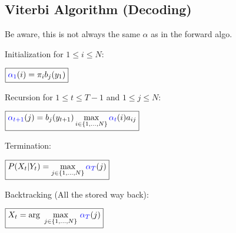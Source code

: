 \begin{minipage}[t]{0.49\textwidth}
\subsection{Viterbi Algorithm (Decoding)}
Be aware, this is not always the same $\alpha$ as in the forward algo.
\begin{aufzaehlung}
	\item Initialization for $1\leq i \leq N$:\\
	
	\vspace{-0.3cm}
	
	$\boxed{\textcolor{blue}{\alpha_1}(i)=\pi_i b_j(y_{1})}$
	\item Recursion for $1\leq t\leq T-1$ and $1\leq j \leq N$:\\
			
		\vspace{-0.3cm}
		
		$\boxed{\textcolor{blue}{\alpha_{t+1}}(j)=b_{j}(y_{t+1}) \max\limits_{i \in \{1,\ldots,N\}}{\textcolor{blue}{\alpha_t}(i)a_{ij}}}$
		
		\item Termination:\\
			
		\vspace{-0.3cm}
		
		$\boxed{P(X_t|Y_t)=\max\limits_{j \in \{1,\ldots,N\}}{\textcolor{blue}{\alpha_T}(j)}}$
	\item Backtracking (All the stored way back):\\
				
		\vspace{-0.3cm}
			
		$\boxed{X_t=\arg~ \underset{j \in \{1,\ldots,N\}}{\max}~{\textcolor{blue}{\alpha_T}(j)}}$
\end{aufzaehlung}	 
\end{minipage}
\hfill
